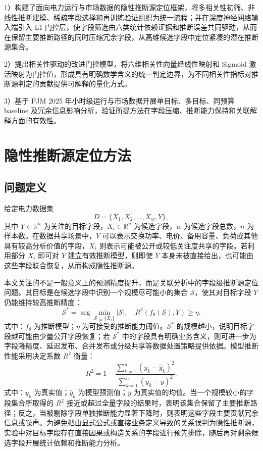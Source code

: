 \documentclass[UTF8,zihao=5,twoside]{ctexart}
\numberwithin{equation}{section}
\begin{document}
1）构建了面向电力运行与市场数据的隐性推断源定位框架，将多相关性初筛、非线性推断建模、稀疏字段选择和再训练验证组织为统一流程；并在深度神经网络输入端引入 L1 门控层，使字段筛选由六类统计依赖证据和推断误差共同驱动，从而在保留主要推断路径的同时压缩冗余字段，从高维候选字段中定位紧凑的潜在推断源集合。

2）提出相关性驱动的改进门控模型，将六维相关性向量经线性映射和 Sigmoid 激活映射为门控值，形成具有明确数学含义的统一判定边界，为不同相关性指标对推断源判定的贡献提供可解释的量化方式。

3）基于 PJM 2025 年小时级运行与市场数据开展单目标、多目标、同预算 baseline 及冗余信息影响分析，验证所提方法在字段压缩、推断能力保持和关联解释方面的有效性。

\section{隐性推断源定位方法}
\subsection{问题定义}
给定电力数据集
\begin{equation}
D=\{X_1,X_2,\ldots,X_w,Y\},
\end{equation}
其中 $Y\in\mathbb{R}^{n}$ 为关注的目标字段，$X_i\in\mathbb{R}^{n}$ 为候选字段，$w$ 为候选字段总数，$n$ 为样本数。在数据共享场景中，$Y$ 可以表示交换功率、电价、备用容量、负荷或其他具有较高分析价值的字段，$X_i$ 则表示可能被公开或较低关注度共享的字段。若利用部分 $X_i$ 即可对 $Y$ 建立有效推断模型，则即使 $Y$ 本身未被直接给出，也可能由这些字段联合恢复，从而构成隐性推断源。

本文关注的不是一般意义上的预测精度提升，而是关联分析中的字段级推断源定位问题。其目标是在候选字段中识别一个规模尽可能小的集合 $\mathcal{S}$，使其对目标字段 $Y$ 仍能维持较高推断精度：
\begin{equation}
\mathcal{S}^{*}=\arg\min_{\mathcal{S}\subseteq \{X_i\}}\left|\mathcal{S}\right|,
\quad
R^2(f_{\theta}(\mathcal{S}),Y)\geq \eta .
\end{equation}
式中：$f_{\theta}$ 为推断模型；$\eta$ 为可接受的推断能力阈值。$\mathcal{S}^{*}$ 的规模越小，说明目标字段越可能由少量公开字段恢复；若 $\mathcal{S}^{*}$ 中的字段具有明确业务含义，则可进一步为字段降精度、延迟发布、合并发布或分级共享等数据处置策略提供依据。模型推断性能采用决定系数 $R^2$ 衡量：
\begin{equation}
R^2=1-\frac{\sum_{k=1}^{n}(y_k-\hat{y}_k)^2}{\sum_{k=1}^{n}(y_k-\bar{y})^2}.
\end{equation}
式中：$y_k$ 为真实值；$\hat{y}_k$ 为模型预测值；$\bar{y}$ 为真实值的均值。当一个规模较小的字段集合所取得的 $R^2$ 接近或超过全量字段的结果时，表明该集合保留了主要推断路径；反之，当被剔除字段单独推断能力显著下降时，则表明这些字段主要贡献冗余信息或噪声。为避免把由显式公式或直接业务定义导致的关系误判为隐性推断源，实验中对目标字段存在直接因果或构造关系的字段进行预先排除，随后再对剩余候选字段开展统计依赖和推断能力分析。
\end{document}

